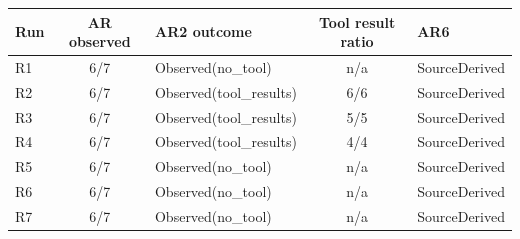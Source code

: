 \begin{tabularx}{\linewidth}{@{}l c l c l@{}}
\toprule
Run & AR observed & AR2 outcome & Tool result ratio & AR6 \\
\midrule
R1 & 6/7 & Observed(no\_tool) & n/a & SourceDerived \\
R2 & 6/7 & Observed(tool\_results) & 6/6 & SourceDerived \\
R3 & 6/7 & Observed(tool\_results) & 5/5 & SourceDerived \\
R4 & 6/7 & Observed(tool\_results) & 4/4 & SourceDerived \\
R5 & 6/7 & Observed(no\_tool) & n/a & SourceDerived \\
R6 & 6/7 & Observed(no\_tool) & n/a & SourceDerived \\
R7 & 6/7 & Observed(no\_tool) & n/a & SourceDerived \\
\bottomrule
\end{tabularx}
